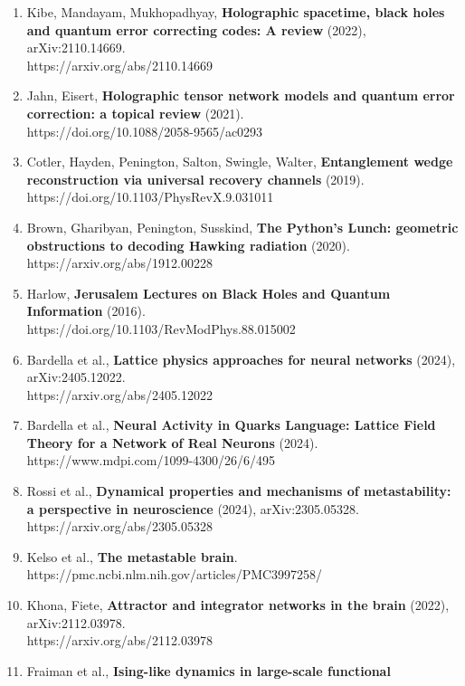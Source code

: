 \documentclass[
]{article}
\begin{document}
\begin{enumerate}
  (2019), arXiv:1807.06041.\\
  https://arxiv.org/abs/1807.06041
\item
  Kibe, Mandayam, Mukhopadhyay, \textbf{Holographic spacetime, black
  holes and quantum error correcting codes: A review} (2022),
  arXiv:2110.14669.\\
  https://arxiv.org/abs/2110.14669
\item
  Jahn, Eisert, \textbf{Holographic tensor network models and quantum
  error correction: a topical review} (2021).\\
  https://doi.org/10.1088/2058-9565/ac0293
\item
  Cotler, Hayden, Penington, Salton, Swingle, Walter,
  \textbf{Entanglement wedge reconstruction via universal recovery
  channels} (2019).\\
  https://doi.org/10.1103/PhysRevX.9.031011
\item
  Brown, Gharibyan, Penington, Susskind, \textbf{The Python's Lunch:
  geometric obstructions to decoding Hawking radiation} (2020).\\
  https://arxiv.org/abs/1912.00228
\item
  Harlow, \textbf{Jerusalem Lectures on Black Holes and Quantum
  Information} (2016).\\
  https://doi.org/10.1103/RevModPhys.88.015002
\item
  Bardella et al., \textbf{Lattice physics approaches for neural
  networks} (2024), arXiv:2405.12022.\\
  https://arxiv.org/abs/2405.12022
\item
  Bardella et al., \textbf{Neural Activity in Quarks Language: Lattice
  Field Theory for a Network of Real Neurons} (2024).\\
  https://www.mdpi.com/1099-4300/26/6/495
\item
  Rossi et al., \textbf{Dynamical properties and mechanisms of
  metastability: a perspective in neuroscience} (2024),
  arXiv:2305.05328.\\
  https://arxiv.org/abs/2305.05328
\item
  Kelso et al., \textbf{The metastable brain}.\\
  https://pmc.ncbi.nlm.nih.gov/articles/PMC3997258/
\item
  Khona, Fiete, \textbf{Attractor and integrator networks in the brain}
  (2022), arXiv:2112.03978.\\
  https://arxiv.org/abs/2112.03978
\item
  Fraiman et al., \textbf{Ising-like dynamics in large-scale functional
}
\end{enumerate}
\end{document}
